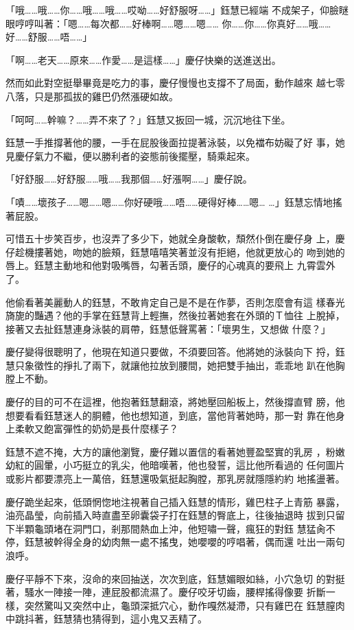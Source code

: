 「哦……哦……你……哦……哦……哎呦……好舒服呀……」鈺慧已經端
不成架子，仰臉瞇眼哼哼叫著：「嗯……每次都……好棒啊……嗯……嗯……
你……你……你真好……哦……好……舒服……唔……」

「啊……老天……原來……作愛……是這樣……」慶仔快樂的送進送出。

然而如此對空挺舉畢竟是吃力的事，慶仔慢慢也支撐不了局面，動作越來
越七零八落，只是那孤拔的雞巴仍然漲硬如故。

「呵呵……幹嘛？……弄不來了？」鈺慧又扳回一城，沉沉地往下坐。

鈺慧一手推撐著他的腰，一手在屁股後面拉提著泳裝，以免襠布妨礙了好
事，她見慶仔氣力不繼，便以勝利者的姿態前後擺壓，騎乘起來。

「好舒服……好舒服……哦……我那個……好漲啊……」慶仔說。

「嘖……壞孩子……嗯……嗯……你好硬哦……唔……硬得好棒……嗯…
…」鈺慧忘情地搖著屁股。

可惜五十步笑百步，也沒弄了多少下，她就全身酸軟，頹然仆倒在慶仔身
上，慶仔趁機摟著她，吻她的臉頰，鈺慧嘻嘻笑著並沒有拒絕，他就更放心的
吻到她的唇上。鈺慧主動地和他對吸嘴唇，勾著舌頭，慶仔的心魂真的要飛上
九霄雲外了。

他偷看著美麗動人的鈺慧，不敢肯定自己是不是在作夢，否則怎麼會有這
樣春光旖旎的豔遇？他的手掌在鈺慧背上輕撫，然後拉著她套在外頭的Ｔ恤往
上脫掉，接著又去扯鈺慧連身泳裝的肩帶，鈺慧低聲罵著：「壞男生，又想做
什麼？」

慶仔變得很聰明了，他現在知道只要做，不須要回答。他將她的泳裝向下
捋，鈺慧只象徵性的掙扎了兩下，就讓他拉放到腰間，她把雙手抽出，乖乖地
趴在他胸膛上不動。

慶仔的目的可不在這裡，他抱著鈺慧翻滾，將她壓回船板上，然後撐直臂
膀，他想要看看鈺慧迷人的胴體，他也想知道，到底，當他背著她時，那一對
靠在他身上柔軟又飽富彈性的奶奶是長什麼樣子？

鈺慧不遮不掩，大方的讓他瀏覽，慶仔難以置信的看著她豐盈堅實的乳房
，粉嫩幼紅的圓暈，小巧挺立的乳尖，他暗嘆著，他也發誓，這比他所看過的
任何圖片或影片都要漂亮上一萬倍，鈺慧還吸氣挺起胸膛，那乳房就隱隱約約
地搖盪著。

慶仔跪坐起來，低頭惘惚地注視著自己插入鈺慧的情形，雞巴柱子上青筋
暴露，油亮晶瑩，向前插入時直盡至卵囊袋子打在鈺慧的臀底上，往後抽退時
拔到只留下半顆龜頭堵在洞門口，剎那間熱血上沖，他短嘯一聲，瘋狂的對鈺
慧猛肏不停，鈺慧被幹得全身的幼肉無一處不搖曳，她嚶嚶的哼唱著，偶而還
吐出一兩句浪呼。

慶仔平靜不下來，沒命的來回抽送，次次到底，鈺慧媚眼如絲，小穴急切
的對挺著，騷水一陣接一陣，連屁股都流濕了。慶仔咬牙切齒，腰桿搖得像要
折斷一樣，突然驚叫又突然中止，龜頭深抵穴心，動作嘎然凝滯，只有雞巴在
鈺慧膣肉中跳抖著，鈺慧猜也猜得到，這小鬼又丟精了。

